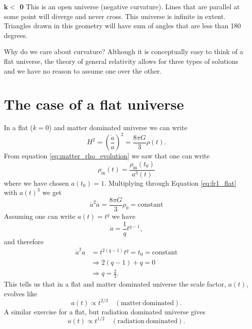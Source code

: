 \documentclass[a4paper,12pt]{article}
\theoremstyle{remark}
\newcommand{\mrm}[1]{\mathrm{#1}}
\renewcommand{\=}[1]{\stackrel{#1}{=}} %
\theoremstyle{plain}
\theoremstyle{definition}
\begin{document}
\textbf{$\bm{k} <$  0}
This is an open universe (negative curvature). Lines that are parallel at some point will diverge and never cross. This universe is infinite in extent. Triangles drawn in this geometry will have sum of angles that are less than 180 degrees.

Why do we care about curvature? Although it is conceptually easy to think of a flat universe, the theory of general relativity allows for three types of solutions and we have no reason to assume one over the other.

\section{The case of a flat universe}
In a flat ($k=0$) and matter dominated universe we can write
\begin{equation}
H^2 = \left( \frac{\dot{a}}{a} \right)^2 = \frac{8\pi G}{3} \rho(t).
\label{eq:fr1_flat}
\end{equation}
From equation \ref{eq:matter_rho_evolution} we saw that one can write
\begin{equation}
\rho _\mrm{m}(t) = \frac{\rho _\mrm{m} (t_0)}{a^3(t)}
\end{equation}
where we have chosen $a(t_0) = 1$. Multiplying through Equation \ref{eq:fr1_flat} with $a(t)^3$ we get
\begin{equation}
\dot{a}^2 a = \frac{8 \pi G}{3} \rho _0 = \mrm{constant}
\end{equation}
Assuming one can write $a(t) = t^q$ we have 
\begin{equation}
\dot{a} = \frac{1}{q}t^{q-1},
\end{equation}
and therefore 
\begin{align}
\dot{a}^2 a &= t^{2(q-1)} t^q = t_0 = \mrm{constant} \nonumber \\
&\Rightarrow 2(q-1) + q = 0 \nonumber \\
&\Rightarrow q = \frac{2}{3}.
\end{align}
This tells us that in a flat and matter dominated universe the scale factor, $a(t)$, evolves like
\begin{equation}
a(t) \propto t^{2/3} \quad \mrm{(matter\: dominated)}.
\end{equation}
A similar exercise for a flat, but radiation dominated universe gives
\begin{equation}
a(t) \propto t^{1/2} \quad \mrm{(radiation\: dominated)}.
\end{equation}
\end{document}
